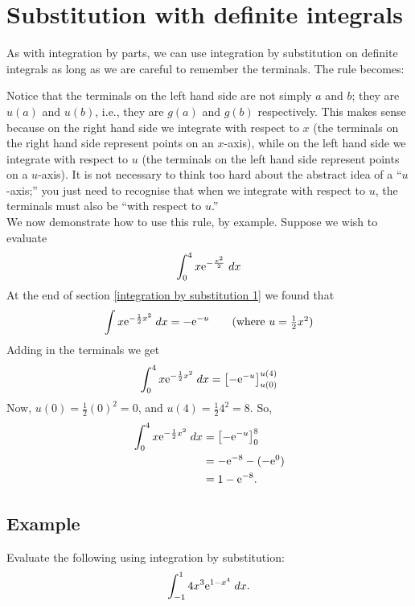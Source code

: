 \section{Substitution with definite integrals} \label{subst definite}
As with integration by parts, we can use integration by substitution on definite integrals as long as we are careful to remember the terminals. The rule becomes:

  	\bigskip
	
	\hfil{}
	\bigskip

\noindent Notice that the terminals on the left hand side are not simply $a$ and $b$; they are $u(a)$ and $u(b)$, i.e.,  they are $g(a)$ and $g(b)$ respectively. This makes sense because on the right hand side we integrate with respect to $x$ (the terminals on the right hand side represent points on an $x$-axis), while on the left hand side we integrate with respect to $u$ (the terminals on the left hand side represent points on a $u$-axis). It is not necessary to think too hard about the abstract idea of a ``$u$-axis;'' you just need to recognise that when we integrate with respect to $u$, the terminals must also be ``with respect to $u$.'' \\

\noindent We now demonstrate how to use this rule, by example. Suppose we wish to evaluate
\[
\int_0^4 x\mathrm{e}^{-\frac{x^2}{2}} \; dx
\]
At the end of section \ref{integration by substitution 1} we found that
\[
\int x\e^{-\frac{1}{2}x^2} \; dx = -\e^{-u} \tag{where $u = \frac{1}{2}x^2$}
\]
Adding in the terminals we get
\[
\int_0^4 x\mathrm{e}^{-\frac{1}{2}x^2} \; dx = \left[-\mathrm{e}^{-u}\right]_{u(0)}^{u(4)}
\]
Now, $u(0) = \frac{1}{2}(0)^2 = 0$, and $u(4) = \frac{1}{2}4^2 = 8$. So,
\begin{align*}
\int_0^4 x\mathrm{e}^{-\frac{1}{2}x^2} \; dx & = \left[-\mathrm{e}^{-u}\right]_0^8 \\\
	& = -\mathrm{e}^{-8} - (-\mathrm{e}^{0}) \\
	& = 1 - \mathrm{e}^{-8}.
\end{align*}

\subsection{Example}
Evaluate the following using integration by substitution:
\[
\int_{-1}^1 4x^3\mathrm{e}^{1-x^4} \; dx.
\]

